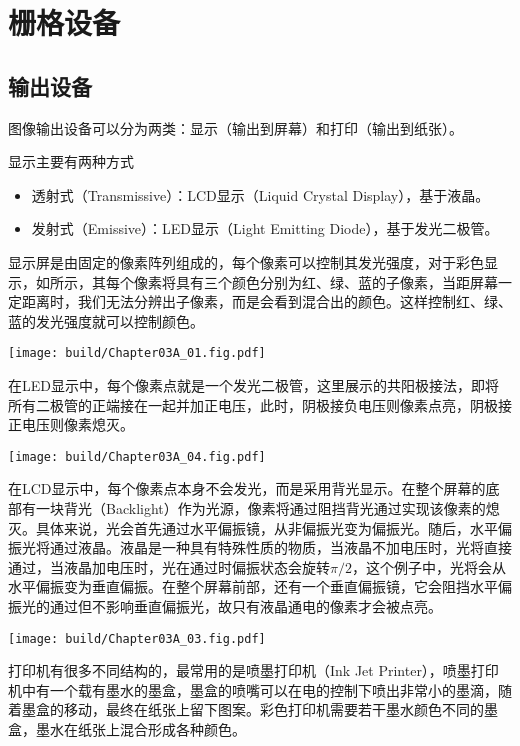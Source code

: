 \section{栅格设备}

\subsection{输出设备}

图像输出设备可以分为两类：显示（输出到屏幕）和打印（输出到纸张）。

显示主要有两种方式
\begin{itemize}
    \item 透射式（Transmissive）：LCD显示（Liquid Crystal Display），基于液晶。
    \item 发射式（Emissive）：LED显示（Light Emitting Diode），基于发光二极管。
\end{itemize}
显示屏是由固定的像素阵列组成的，每个像素可以控制其发光强度，对于彩色显示，如所示，其每个像素将具有三个颜色分别为红、绿、蓝的子像素，当距屏幕一定距离时，我们无法分辨出子像素，而是会看到混合出的颜色。这样控制红、绿、蓝的发光强度就可以控制颜色。

\begin{Figure}[彩色显示的原理]
    \texttt{[image: build/Chapter03A\_01.fig.pdf]}
\end{Figure}

在LED显示中，每个像素点就是一个发光二极管，这里展示的共阳极接法，即将所有二极管的正端接在一起并加正电压，此时，阴极接负电压则像素点亮，阴极接正电压则像素熄灭。

\begin{Figure}[LED显示]
    \texttt{[image: build/Chapter03A\_04.fig.pdf]}
\end{Figure}

在LCD显示中，每个像素点本身不会发光，而是采用背光显示。在整个屏幕的底部有一块背光（Backlight）作为光源，像素将通过阻挡背光通过实现该像素的熄灭。具体来说，光会首先通过水平偏振镜，从非偏振光变为偏振光。随后，水平偏振光将通过液晶。液晶是一种具有特殊性质的物质，当液晶不加电压时，光将直接通过，当液晶加电压时，光在通过时偏振状态会旋转$\pi/2$，这个例子中，光将会从水平偏振变为垂直偏振。在整个屏幕前部，还有一个垂直偏振镜，它会阻挡水平偏振光的通过但不影响垂直偏振光，故只有液晶通电的像素才会被点亮。
\begin{Figure}[LED显示]
    \texttt{[image: build/Chapter03A\_03.fig.pdf]}
\end{Figure}

打印机有很多不同结构的，最常用的是喷墨打印机（Ink Jet Printer），喷墨打印机中有一个载有墨水的墨盒，墨盒的喷嘴可以在电的控制下喷出非常小的墨滴，随着墨盒的移动，最终在纸张上留下图案。彩色打印机需要若干墨水颜色不同的墨盒，墨水在纸张上混合形成各种颜色。


